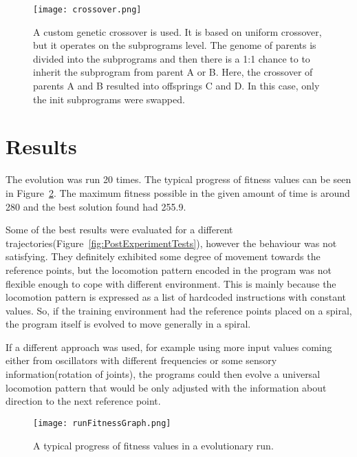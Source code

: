 \documentclass{ExcelAtFIT}
\begin{document}
\begin{figure}[t]
	\centering
	{\texttt{[image: crossover.png]}}
	\caption{
	A custom genetic crossover is used.
	It is based on uniform crossover, but it operates on the subprograms level.
	The genome of parents is divided into the subprograms and then there is a 1:1 chance to to inherit the subprogram from parent A or B.
	Here, the crossover of parents A and B resulted into offsprings C and D.
	In this case, only the init subprograms were swapped.
	}
	\label{fig:Crossover}
\end{figure}




\section{Results}
The evolution was run 20 times.
The typical progress of fitness values can be seen in Figure~\ref{fig:FitnessGraph}.
The maximum fitness possible in the given amount of time is around 280 and the best solution found had 255.9.

Some of the best results were evaluated for a different trajectories(Figure~\ref{fig:PostExperimentTests}), however the behaviour was not satisfying.
They definitely exhibited some degree of movement towards the reference points, but the locomotion pattern encoded in the program was not flexible enough to cope with different environment.
This is mainly because the locomotion pattern is expressed as a list of hardcoded instructions with constant values.
So, if the training environment had the reference points placed on a spiral, the program itself is evolved to move generally in a spiral.

If a different approach was used, for example using more input values coming either from oscillators with different frequencies or some sensory information(rotation of joints), the programs could then evolve a universal locomotion pattern that would be only adjusted with the information about direction to the next reference point.

\begin{figure}[t]
	\centering
	{\texttt{[image: runFitnessGraph.png]}}
	\caption{
	A typical progress of fitness values in a evolutionary run.
	}
	\label{fig:FitnessGraph}
\end{figure}
\end{document}
